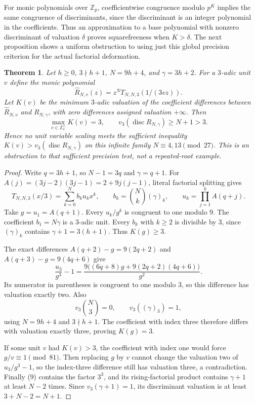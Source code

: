 \documentclass[11pt]{article}
\newtheorem{theorem}{Theorem}
\begin{document}
For monic polynomials over $\mathbb Z_p$, coefficientwise congruence
modulo $p^K$ implies the same congruence of discriminants, since the
discriminant is an integer polynomial in the coefficients.
Thus an approximation to a base polynomial with nonzero discriminant
of valuation $\delta$ proves squarefreeness when $K>\delta$.
The next proposition shows a uniform obstruction to using just this
global precision criterion for the actual factorial deformation.

\begin{theorem}\label{thm:precisionobstruction}
Let $h\ge0$, $3\nmid h+1$, $N=9h+4$, and $\gamma=3h+2$.
For a $3$-adic unit $v$ define the monic polynomial
\[
 \widehat R_{N,v}(z)=z^N T_{N,N,3}(1/(3vz)).
\]
Let $K(v)$ be the minimum $3$-adic valuation of the coefficient
differences between $\widehat R_{N,v}$ and $R_{N,\gamma}$,
with zero differences assigned valuation $+\infty$.
Then
\[
 \max_{v\in\mathbb Z_3^\times}K(v)=3,\qquad
 v_3(\operatorname{disc}R_{N,\gamma})\ge N+1>3.               \tag{12}
\]
Hence no unit variable scaling meets the sufficient inequality
$K(v)>v_3(\operatorname{disc}R_{N,\gamma})$ on this infinite
family $N\equiv4,13\pmod{27}$.
This is an obstruction to that sufficient precision test,
not a repeated-root example.
\end{theorem}
\begin{proof}
Write $q=3h+1$, so $N-1=3q$ and $\gamma=q+1$.
For $A(j)=(3j-2)(3j-1)=2+9j(j-1)$, literal factorial splitting gives
\[
 T_{N,N,3}(x/3)=
   \sum_{k=0}^N b_k u_k x^k,\qquad
 b_k=\binom Nk(\gamma)_k,\qquad
 u_k=\prod_{j=1}^k A(q+j).
\]
Take $g=u_1=A(q+1)$.
Every $u_k/g^k$ is congruent to one modulo $9$.
The coefficient $b_1=N\gamma$ is a $3$-adic unit.
Every $b_k$ with $k\ge2$ is divisible by $3$, since
$(\gamma)_k$ contains $\gamma+1=3(h+1)$.
Thus $K(g)\ge3$.

The exact differences
$A(q+2)-g=9(2q+2)$ and $A(q+3)-g=9(4q+6)$ give
\[
 \frac{u_3}{g^3}-1
 =\frac{9\bigl((6q+8)g+9(2q+2)(4q+6)\bigr)}{g^2}.
\]
Its numerator in parentheses is congruent to one modulo $3$,
so this difference has valuation exactly two.
Also
\[
 v_3\binom N3=0,\qquad v_3((\gamma)_3)=1,
\]
using $N=9h+4$ and $3\nmid h+1$.
The coefficient with index three therefore differs with valuation
exactly three, proving $K(g)=3$.

If some unit $v$ had $K(v)>3$, the coefficient with index one
would force $g/v\equiv1\pmod{81}$.
Then replacing $g$ by $v$ cannot change the valuation two of
$u_3/g^3-1$, so the index-three difference still has valuation
three, a contradiction.
Finally (9) contains the factor $3^3$, and its rising-factorial
product contains $\gamma+1$ at least $N-2$ times.
Since $v_3(\gamma+1)=1$, its discriminant valuation is at least
$3+N-2=N+1$.
\end{proof}
\end{document}
